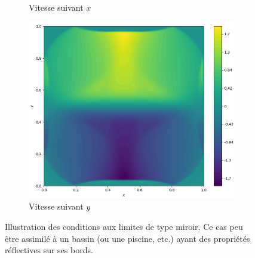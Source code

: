 \documentclass[
	french,
	11pt, %
]{fphw}
\begin{document}
\begin{figure}[H]
\begin{subfigure}{0.32\textwidth}
		\caption{Vitesse suivant $x$}
		\label{fig:Bord1u}
	\end{subfigure}
	\begin{subfigure}{0.32\textwidth}
		\centering
		\includegraphics[width=\textwidth,height=0.85\textwidth]{Bord1v.png}
		\caption{Vitesse suivant $y$}
		\label{fig:Bord1v}
	\end{subfigure}
	\caption{Illustration des conditions aux limites de type miroir. Ce cas peu être assimilé à un bassin (ou une piscine, etc.) ayant des propriétés réflectives sur ses bords.}
	\label{fig:Bord1}
\end{figure}
\end{document}
